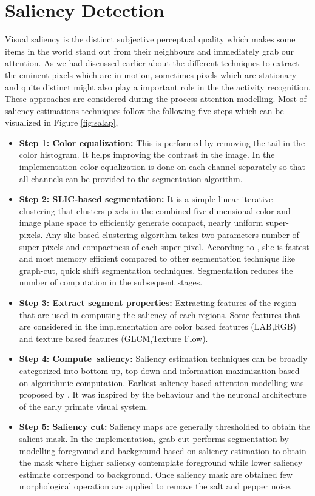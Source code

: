 \section{Saliency Detection}
 \label{sec:sal}
Visual saliency is the distinct subjective perceptual quality which makes some items in the world stand out from their neighbours and immediately grab our attention.
As we had discussed earlier about the different techniques to extract the eminent pixels which are in motion, sometimes pixels which are stationary and quite distinct might also play a important role in the the activity recognition. These approaches are considered during the process attention modelling. Most of saliency estimations techniques follow the following five steps which can be visualized in Figure \ref{fig:salap},
\begin{itemize}
\item{\textbf{Step 1: Color equalization:} This is performed by removing the tail in the color histogram. It helps improving the contrast in the image. In the implementation color equalization is done on each channel separately so that all channels can be provided to the segmentation algorithm.}

\item{ \textbf{Step 2: SLIC-based segmentation:}  It is a simple linear iterative clustering that clusters pixels in the combined five-dimensional color and image plane space to efficiently generate compact, nearly uniform super-pixels. Any slic based clustering algorithm takes two parameters number of super-pixels and compactness of each super-pixel. According to \cite{slic}, slic is fastest and most memory efficient compared to  other segmentation technique like graph-cut, quick shift segmentation techniques. Segmentation reduces the number of computation in the subsequent stages.}

\item{ \textbf{Step 3: Extract segment properties:} Extracting features of the region that are used in computing the saliency of each regions. Some features that are considered in the implementation are color based features (LAB,RGB) and texture based features (GLCM,Texture Flow).}

\item{\textbf{Step 4: Compute~saliency:} Saliency estimation techniques can be broadly categorized into bottom-up, top-down and information maximization based on algorithmic computation. Earliest saliency based attention modelling was proposed by \cite{itti}. It was inspired by the behaviour and the neuronal architecture of the early primate visual system.}

\item{\textbf{Step 5: Saliency cut:} Saliency maps are generally thresholded to obtain the salient mask. In the implementation, grab-cut\citep{grab-cut} performs segmentation by modelling foreground and background based on saliency estimation to obtain the mask where higher saliency  contemplate foreground while lower saliency estimate correspond to background. Once saliency mask are obtained few morphological operation are applied to remove the salt and pepper noise.}
\end{itemize}

